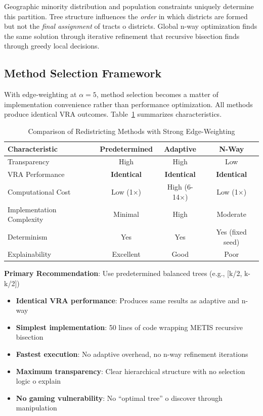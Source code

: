 Geographic minority distribution and population constraints uniquely determine this partition. Tree structure influences the \textit{order} in which districts are formed but not the \textit{final assignment} of tracts 	o districts. Global n-way optimization finds the same solution through iterative refinement that recursive bisection finds through greedy local decisions.

\subsection{Method Selection Framework}

With edge-weighting at $\alpha = 5$, method selection becomes a matter of implementation convenience rather than performance optimization. All methods produce identical VRA outcomes. Table~\ref{tab:method_comparison} summarizes characteristics.

\begin{table}[h]
\centering
\caption{Comparison of Redistricting Methods with Strong Edge-Weighting}
\label{tab:method_comparison}
\begin{tabular}{lccc}
\toprule
\textbf{Characteristic} & \textbf{Predetermined} & \textbf{Adaptive} & \textbf{N-Way} \\
\midrule
Transparency & High & High & Low \\
VRA Performance & \textbf{Identical} & \textbf{Identical} & \textbf{Identical} \\
Computational Cost & Low (1×) & High (6-14×) & Low (1×) \\
Implementation Complexity & Minimal & High & Moderate \\
Determinism & Yes & Yes & Yes (fixed seed) \\
Explainability & Excellent & Good & Poor \\
\bottomrule
\end{tabular}
\end{table}

\textbf{Primary Recommendation}: Use predetermined balanced trees (e.g., [k/2, k-k/2])
\begin{itemize}
\item \textbf{Identical VRA performance}: Produces same results as adaptive and n-way
\item \textbf{Simplest implementation}: 50 lines of code wrapping METIS recursive bisection
\item \textbf{Fastest execution}: No adaptive overhead, no n-way refinement iterations
\item \textbf{Maximum transparency}: Clear hierarchical structure with no selection logic 	o explain
\item \textbf{No gaming vulnerability}: No ``optimal tree'' 	o discover through manipulation
\end{itemize}

